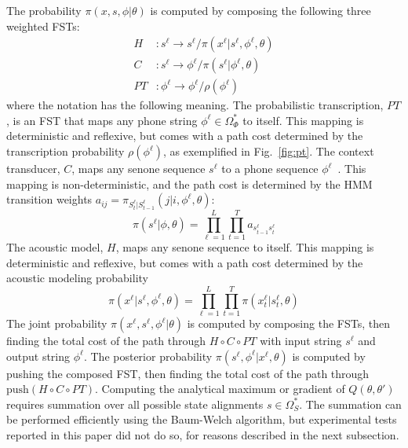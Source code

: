 The probability $\pi(x,s,\phi|\theta)$ is computed by composing the
following three weighted FSTs:
\begin{align}
  H&:s^\ell\rightarrow s^\ell/ \pi(x^\ell|s^\ell,\phi^\ell,\theta)\\
  C&:s^\ell\rightarrow \phi^\ell/ \pi(s^\ell|\phi^\ell,\theta)\\
  PT&:\phi^\ell\rightarrow\phi^\ell/ \rho(\phi^\ell)
\end{align}
where the notation has the following meaning.  The probabilistic
transcription, $PT$, is an FST that maps any phone string
$\phi^\ell\in\Omega_\Phi^*$ to itself.  This mapping is deterministic
and reflexive, but comes with a path cost determined by the
transcription probability $\rho(\phi^\ell)$, as exemplified in
Fig.~\ref{fig:pt}.  The context transducer, $C$, maps any senone
sequence $s^\ell$ to a phone sequence $\phi^\ell$~\cite{Mohri2002}.
This mapping is non-deterministic, and the path cost is determined by
the HMM transition weights
$a_{ij}=\pi_{S_t^{\ell}|S_{t-1}^{\ell}}(j|i,\phi^\ell,\theta)$:
\begin{equation}
  \pi(s^\ell|\phi,\theta)=\prod_{\ell=1}^L\prod_{t=1}^T
  a_{s_{t-1}^\ell s_t^\ell}
\end{equation}
The acoustic model, $H$, maps any senone sequence to
itself.  This mapping is deterministic and reflexive, but comes with a
path cost determined by the acoustic modeling probability
\begin{equation}
  \pi(x^\ell|s^\ell,\phi^\ell,\theta)=\prod_{\ell=1}^L\prod_{t=1}^T
  \pi(x_t^\ell|s_t^\ell,\theta)
\end{equation}
The joint probability $\pi(x^\ell,s^\ell,\phi^\ell|\theta)$ is
computed by composing the FSTs, then finding the total cost of the
path through $H\circ C\circ PT$ with input string $s^\ell$ and
output string $\phi^\ell$.  The posterior probability
$\pi(s^\ell,\phi^\ell|x^\ell,\theta)$ is computed by pushing the
composed FST, then finding the total cost of the path through
$\textrm{push}\left(H\circ C\circ PT\right)$.
Computing the
analytical maximum or gradient of $Q\left(\theta,\theta'\right)$
requires summation over all possible state alignments
$s\in\Omega_S^*$.  The summation can be performed efficiently using
the Baum-Welch algorithm, but experimental tests reported in this
paper did not do so, for reasons described in the next subsection.
